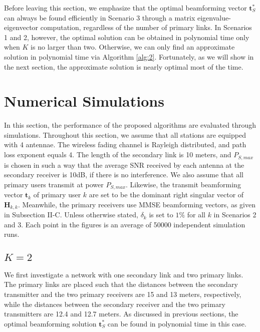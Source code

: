 \documentclass[twocolumn,10pt]{IEEEtran}
\theoremstyle{plain} \newtheorem{theorem}{Theorem}
\theoremstyle{plain} \newtheorem{proposition}{Proposition}
\theoremstyle{plain} \newtheorem{corollary}{Corollary}
\theoremstyle{remark} \newtheorem{remark}{Remark}
\theoremstyle{remark} \newtheorem{lemma}{Lemma}
\theoremstyle{plain} \newtheorem{definition}{Definition}
\theoremstyle{plain} \newtheorem{assumption}{Assumption}
\theoremstyle{plain} \newtheorem{fact}{Fact}
\begin{document}
Before leaving this section, we emphasize that the optimal beamforming vector $\mathbf{t}_S^*$ can always be found efficiently in Scenario 3 through a matrix eigenvalue-eigenvector computation, regardless of the number of primary links. In Scenarios 1 and 2, however, the optimal solution can be obtained in polynomial time only when $K$ is no larger than two. Otherwise, we can only find an approximate solution in polynomial time via Algorithm \ref{alg:2}. Fortunately, as we will show in the next section, the approximate solution is nearly optimal most of the time.

\section{Numerical Simulations}\label{sec:simulation}
In this section, the performance of the proposed algorithms are evaluated through simulations. Throughout this section, we assume that all stations are equipped with 4 antennae. The wireless fading channel is Rayleigh distributed, and path loss exponent equals 4. The length of the secondary link is 10 meters, and $P_{S,max}$ is chosen in such a way that the average SNR received by each antenna at the secondary receiver is 10dB, if there is no interference. We also assume that all primary users transmit at power $P_{S,max}$. Likewise, the transmit beamforming vector $\mathbf{t}_k$ of primary user $k$ are set to be the dominant right singular vector of  $\mathbf{H}_{k,k}$. Meanwhile, the primary receivers use MMSE beamforming vectors, as given in Subsection II-C. Unless otherwise stated, $\delta_k$ is set to $1\%$ for all $k$ in Scenarios 2 and 3. Each point in the figures is an average of 50000 independent simulation runs.

\subsection{$K=2$}

We first investigate a network with one secondary link and two primary links. The primary links are placed such that the distances between the secondary transmitter and the two primary receivers are 15 and 13 meters, respectively, while the distances between the secondary receiver and the two primary transmitters are 12.4 and 12.7 meters. As discussed in previous sections, the optimal beamforming solution $\mathbf{t}_S^*$ can be found in polynomial time in this case.
\end{document}
